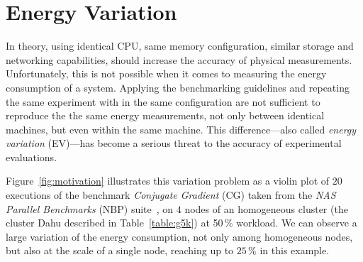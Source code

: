 








\section{Energy Variation}\label{sec:energy_variation}
In theory, using identical CPU, same memory configuration, similar storage and networking capabilities, should increase the accuracy of physical measurements.
Unfortunately, this is not possible when it comes to measuring the energy consumption of a system.
Applying the benchmarking guidelines and repeating the same experiment with in the same configuration are not sufficient to reproduce the the same energy measurements, not only between identical machines, but even within the same machine.
This difference---also called \emph{energy variation} (EV)---has become a serious threat to the accuracy of experimental evaluations.

Figure~\ref{fig:motivation} illustrates this variation problem as a violin plot of $20$ executions of the benchmark \emph{Conjugate Gradient} (\textsf{CG}) taken from the \emph{NAS Parallel Benchmarks} (NBP) suite~\cite{Bailey:1991:NPB:125826.125925}, on $4$ nodes of an homogeneous cluster (the cluster \textsf{Dahu} described in Table~\ref{table:g5k}) at 50\,\% workload.
We can observe a large variation of the energy consumption, not only among homogeneous nodes, but also at the scale of a single node, reaching up to $25\,\%$ in this example.

